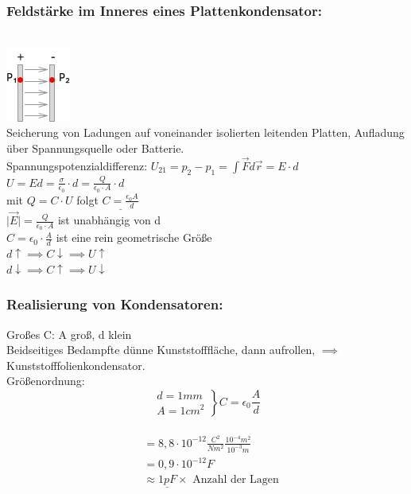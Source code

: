 \documentclass[11pt]{article}
\begin{document}
\subsubsection{Feldstärke im Inneres eines Plattenkondensator:}

\hfill\\
\includegraphics{skizzen/14/14_8B7}
\hfill\\

Seicherung von Ladungen auf voneinander isolierten leitenden Platten, Aufladung über Spannungsquelle oder Batterie.\\

Spannungspotenzialdifferenz: $ U_{21}=p_2-p_1=\int \vec{F}d\vec{r}=E\cdot d $\\
$ U = Ed=\frac{\sigma}{\epsilon_0}\cdot d = \frac{Q}{\epsilon_0\cdot A}\cdot d $\\
mit $Q=C\cdot U$ folgt $ \underline{C=\frac{\epsilon_0 A}{d}} $\\

$\boxed{\vert\vec{E}\vert=\frac{Q}{\epsilon_0\cdot A}}$ ist unabhängig von d\\

$\boxed{C=\epsilon_0\cdot \frac{A}{d}}$ ist eine rein geometrische Grö\ss{}e\\

$d\uparrow \implies C\downarrow \implies U\uparrow$\\

$d\downarrow \implies C\uparrow \implies U \downarrow$\\


\subsubsection{Realisierung von Kondensatoren:}

Gro\ss{}es C: A gro\ss{}, d klein\\
Beidseitiges Bedampfte dünne Kunststofffläche, dann aufrollen, $\implies$ Kunststofffolienkondensator.\\

Grö\ss{}enordnung: \begin{equation} \left. \begin{aligned} d=1mm\\ A=1cm^2\end{aligned}\right\}C=\epsilon_0\frac{A}{d}\end{equation}\\
	 \begin{align*}&=8,8\cdot 10^{-12}\frac{C^2}{Nm^2}\frac{10^{-4}m^2}{10^{-3}m}\\
	 &=0,9\cdot 10^{-12}F\\
	 &\approx \underline{1pF} \times \text{ Anzahl der Lagen}
	 \end{align*}
\end{document}
